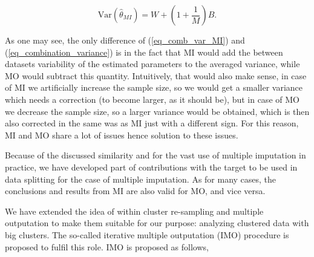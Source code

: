 \documentclass[11pt,a5paper,twoside]{book}
\begin{document}
\begin{equation}
\label{eq_comb_var_MI}
\mathrm{Var}(\widehat{\theta}_{MI}) = W + (1 + \frac{1}{M}) B.
\end{equation}

As one may see, the only difference of (\ref{eq_comb_var_MI}) and (\ref{eq_combination_variance}) is in the fact that MI would add the between datasets variability of the estimated parameters to the averaged variance, while MO would subtract this quantity. Intuitively, that would also make sense, in case of MI we artificially increase the sample size, so we would get a smaller variance which needs a correction (to become larger, as it should be), but in case of MO we decrease the sample size, so a larger variance would be obtained, which is then also corrected in the same was as MI just with a different sign. For this reason, MI and MO share a lot of issues hence solution to these issues.

Because of the discussed similarity and for the vast use of multiple imputation in practice, we have developed part of contributions with the target to be used in data splitting for the case of multiple imputation. As for many cases, the conclusions and results from MI are also valid for MO, and vice versa. 

We have extended the idea of within cluster re-sampling and multiple outputation to make them suitable for our purpose: analyzing clustered data with big clusters. The so-called iterative multiple outputation (IMO) procedure is proposed to fulfil this role. IMO is proposed as follows,

\end{document}
